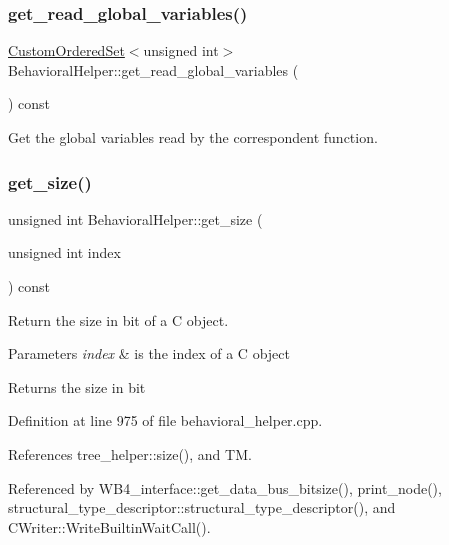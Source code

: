 \subsubsection{\texorpdfstring{get\+\_\+read\+\_\+global\+\_\+variables()}{get\_read\_global\_variables()}}
{\footnotesize\ttfamily \hyperlink{classCustomOrderedSet}{Custom\+Ordered\+Set}$<$unsigned int$>$ Behavioral\+Helper\+::get\+\_\+read\+\_\+global\+\_\+variables (\begin{DoxyParamCaption}{ }\end{DoxyParamCaption}) const}



Get the global variables read by the correspondent function. 

\mbox{\label{classBehavioralHelper_a9106c1fa2b8bab1952a56c53b3e616a0}} 
\subsubsection{\texorpdfstring{get\+\_\+size()}{get\_size()}}
{\footnotesize\ttfamily unsigned int Behavioral\+Helper\+::get\+\_\+size (\begin{DoxyParamCaption}\item[{unsigned int}]{index }\end{DoxyParamCaption}) const\hspace{0.3cm}{\ttfamily [virtual]}}



Return the size in bit of a C object. 


\begin{DoxyParams}{Parameters}
{\em index} & is the index of a C object \\
\hline
\end{DoxyParams}
\begin{DoxyReturn}{Returns}
the size in bit 
\end{DoxyReturn}


Definition at line 975 of file behavioral\+\_\+helper.\+cpp.



References tree\+\_\+helper\+::size(), and TM.



Referenced by W\+B4\+\_\+interface\+::get\+\_\+data\+\_\+bus\+\_\+bitsize(), print\+\_\+node(), structural\+\_\+type\+\_\+descriptor\+::structural\+\_\+type\+\_\+descriptor(), and C\+Writer\+::\+Write\+Builtin\+Wait\+Call().


